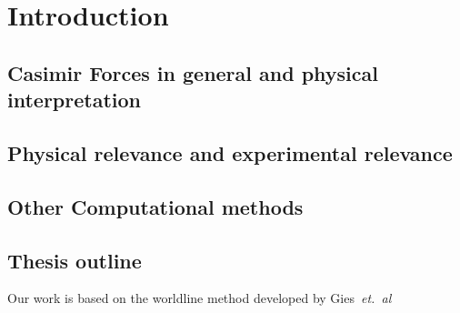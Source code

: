\chapter{Introduction}
\section{Casimir Forces in general and physical interpretation}
\section{Physical relevance and experimental relevance}
\section{Other Computational methods}
\section{Thesis outline}


Our work is based on the worldline method developed by Gies~\textit{et.~al}\cite{Gies03}